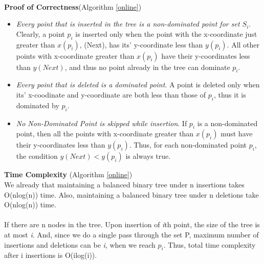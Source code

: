 \documentclass{article}
\begin{document}
\\
\textbf{Proof of Correctness}(Algorithm \ref{online})
\begin{itemize}
\item \emph{Every point that is inserted in the tree is a non-dominated point for set $S_i$}. Clearly, a point $p_i$ is inserted only when the point with the x-coordinate just greater than $x(p_i)$, (Next), has its' y-coordinate less than $y(p_i)$. All other points with x-coordinate greater than $x(p_i)$ have their y-coordinates less than $y(Next)$, and thus no point already in the tree can dominate $p_i$.
\item \emph{Every point that is deleted is a dominated point}. A point is deleted only when its' x-coodinate and y-coordinate are both less than those of $p_i$, thus it is dominated by $p_i$.
\item \emph{No Non-Dominated Point is skipped while insertion}. If $p_i$ is a non-dominated point, then all the points with x-coordinate greater than $x(p_i)$ must have their y-coordinates less than $y(p_i)$. Thus, for each non-dominated point $p_i$, the condition $y(Next) < y(p_i)$ is always true.
\end{itemize}
\textbf{Time Complexity} (Algorithm \ref{online})\\
We already that maintaining a balanced binary tree under n insertions takes O(nlog(n)) time. Also, maintaining a balanced binary tree under n deletions take O(nlog(n)) time.\\ \\
If there are n nodes in the tree. Upon insertion of \emph{i}th point, the size of the tree is at most \emph{i}. And, since we do a \newline single pass through the set P, maximum number of insertions and deletions can be \emph{i}, when we reach $p_i$. Thus, total time complexity after i insertions is O(ilog(i)).
\end{document}
